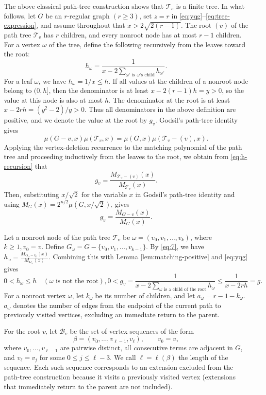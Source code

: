 \documentclass[11pt, a4paper]{article}
\theoremstyle{plain}
\begin{document}
The above classical path-tree construction shows that $\mathcal{T}_v$ is a finite tree.
In what follows, let $G$ be an $r$-regular graph $(r\geq3)$,
set $z=r$ in \eqref{eq:yqg}--\eqref{eq:tree-expression},
and assume throughout that $x>2\sqrt{2(r-1)}$.
The root $(v)$ of the path tree $\mathcal{T}_v$ has $r$ children,
and every nonroot node has at most $r-1$ children.
For a vertex $\omega$ of the tree, define the following recursively from the leaves toward the root:
\begin{equation}\label{eq:h-recursion}
 h_\omega=\frac1{x-2\sum_{\omega'\text{ is }\omega\text{'s child}}h_{\omega'}}.
\end{equation}
For a leaf $\omega$, we have $h_\omega=1/x\leq h$.
If all values at the children of a nonroot node belong to $(0,h]$, then the denominator is at least
$x-2(r-1)h=y>0$, so the value at this node is also at most $h$.
The denominator at the root is at least $x-2rh=(y^2-2)/y>0$.
Thus all denominators in the above definition are positive,
and we denote the value at the root by $g_v$.
Godsil's path-tree identity \cite{Godsil1981} gives
\[
\mu(G-v,x)\mu(\mathcal{T}_v,x)
=
\mu(G,x)\mu(\mathcal{T}_v-(v),x).
\]
Applying the vertex-deletion recurrence to the matching polynomial of the path tree and proceeding inductively from the leaves to the root,
we obtain from \eqref{eq:h-recursion} that
\[
g_v=\frac{M_{\mathcal{T}_v-(v)}(x)}{M_{\mathcal{T}_v}(x)}.
\]
Then, substituting $x/\sqrt2$ for the variable $x$ in Godsil's path-tree identity and using
$M_G(x)=2^{n/2}\mu(G,x/\sqrt2)$,
gives
\begin{equation}\label{eq:root-ratio}
 g_v=\frac{M_{G-v}(x)}{M_G(x)}.
\end{equation}

Let a nonroot node of the path tree $\mathcal{T}_v$ be
$\omega=(v_0,v_1,\ldots,v_k)$,
where $k\ge 1, v_0=v$.
Define
$G_\omega
=
G-\{v_0,v_1,\ldots,v_{k-1}\}$.
By \eqref{eq:7}, we have
$h_\omega = \frac{M_{G_\omega - v_k}(x)}{M_{G_\omega}(x)}$.
Combining this with Lemma \ref{lem:matching-positive} and \eqref{eq:yqg} gives
\[
 0<h_\omega\leq h\quad(\omega\text{ is not the root}),
 0<g_v
=\frac1{x-2\sum_{\omega\text{ is a child of the root}}h_\omega}
\le \frac1{x-2rh}=g.
\]
For a nonroot vertex $\omega$, let $k_\omega$ be its number of children, and let
$a_\omega=r-1-k_\omega$.
$a_\omega$ denotes the number of edges from the endpoint of the current path to previously visited vertices, excluding an immediate return to the parent.

For the root $v$, let $\mathcal{B}_v$ be the set of vertex sequences of the form
\begin{equation}\label{eq:blocked-definition}
 \beta=(v_0,\ldots,v_{\ell-1},v_\ell),
 \qquad v_0=v,
\end{equation}
where $v_0,\ldots,v_{\ell-1}$ are pairwise distinct, all consecutive terms are adjacent in $G$,
and $v_\ell=v_j$ for some $0\leq j\leq\ell-3$.
We call $\ell=\ell(\beta)$ the length of the sequence.
Each such sequence corresponds to an extension excluded from the path-tree construction because it visits a previously visited vertex
(extensions that immediately return to the parent are not included).
\end{document}

